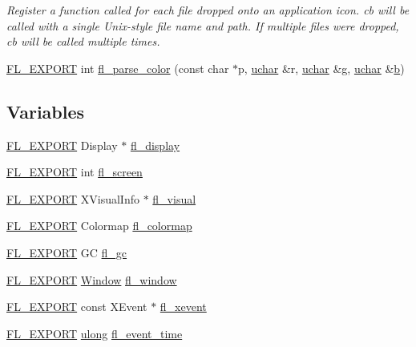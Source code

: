 \begin{DoxyCompactItemize}
\begin{DoxyCompactList}\small\item\em Register a function called for each file dropped onto an application icon. {\itshape cb} will be called with a single Unix-\/style file name and path. If multiple files were dropped, {\itshape cb} will be called multiple times. \end{DoxyCompactList}\item 
\hyperlink{_fl___export_8_h_aa9ba29a18aee9d738370a06eeb4470fc}{F\+L\+\_\+\+E\+X\+P\+O\+RT} int \hyperlink{x_8_h_a0a5c5c56a06c3e23e509e6c0125e95e7}{fl\+\_\+parse\+\_\+color} (const char $\ast$p, \hyperlink{fl__types_8h_a65f85814a8290f9797005d3b28e7e5fc}{uchar} \&r, \hyperlink{fl__types_8h_a65f85814a8290f9797005d3b28e7e5fc}{uchar} \&g, \hyperlink{fl__types_8h_a65f85814a8290f9797005d3b28e7e5fc}{uchar} \&\hyperlink{forms_8_h_a0ba06a290a384fa06b1b90745827dae2}{b})
\end{DoxyCompactItemize}
\subsection*{Variables}
\begin{DoxyCompactItemize}
\item 
\hyperlink{_fl___export_8_h_aa9ba29a18aee9d738370a06eeb4470fc}{F\+L\+\_\+\+E\+X\+P\+O\+RT} Display $\ast$ \hyperlink{x_8_h_ae4842a1fc7d2d7b95afeaba5611fc426}{fl\+\_\+display}
\item 
\hyperlink{_fl___export_8_h_aa9ba29a18aee9d738370a06eeb4470fc}{F\+L\+\_\+\+E\+X\+P\+O\+RT} int \hyperlink{x_8_h_a42a55d8c59138d9f0fa899491c25560c}{fl\+\_\+screen}
\item 
\hyperlink{_fl___export_8_h_aa9ba29a18aee9d738370a06eeb4470fc}{F\+L\+\_\+\+E\+X\+P\+O\+RT} X\+Visual\+Info $\ast$ \hyperlink{x_8_h_abe861b6ba1d71b2f73e3883c10ac5c27}{fl\+\_\+visual}
\item 
\hyperlink{_fl___export_8_h_aa9ba29a18aee9d738370a06eeb4470fc}{F\+L\+\_\+\+E\+X\+P\+O\+RT} Colormap \hyperlink{x_8_h_afcd48cb4e62b0bfee6102e98c7d0cb38}{fl\+\_\+colormap}
\item 
\hyperlink{_fl___export_8_h_aa9ba29a18aee9d738370a06eeb4470fc}{F\+L\+\_\+\+E\+X\+P\+O\+RT} GC \hyperlink{x_8_h_a6a655a6955c7b194471666e8055ca876}{fl\+\_\+gc}
\item 
\hyperlink{_fl___export_8_h_aa9ba29a18aee9d738370a06eeb4470fc}{F\+L\+\_\+\+E\+X\+P\+O\+RT} \hyperlink{mac_8_h_a213656d363e884b651cc92f58e863fc6}{Window} \hyperlink{x_8_h_afdab6664143864c36ba6b51782b32500}{fl\+\_\+window}
\item 
\hyperlink{_fl___export_8_h_aa9ba29a18aee9d738370a06eeb4470fc}{F\+L\+\_\+\+E\+X\+P\+O\+RT} const X\+Event $\ast$ \hyperlink{x_8_h_a5c84596f8b5051b5c3125eb60bb51e0c}{fl\+\_\+xevent}
\item 
\hyperlink{_fl___export_8_h_aa9ba29a18aee9d738370a06eeb4470fc}{F\+L\+\_\+\+E\+X\+P\+O\+RT} \hyperlink{fl__types_8h_a718b4eb2652c286f4d42dc18a8e71a1a}{ulong} \hyperlink{x_8_h_a5112b03f22e38209736b7d21a6d100ab}{fl\+\_\+event\+\_\+time}
\end{DoxyCompactItemize}


